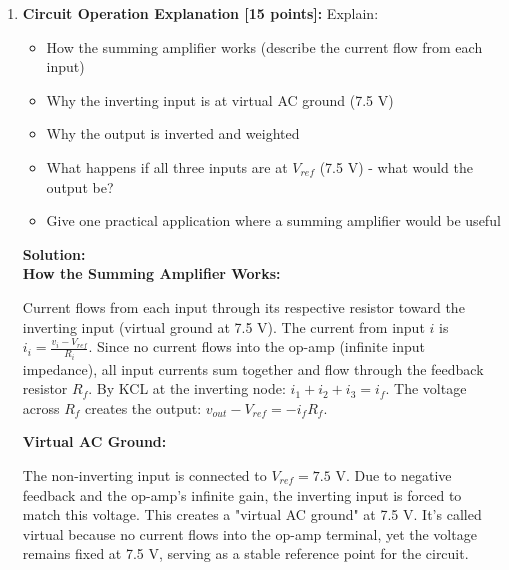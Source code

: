 \documentclass[11pt]{article}
\newenvironment{solution}
    {\color{blue}\textbf{Solution:}\\}
    {}
\begin{document}
\begin{enumerate}[label=\textbf{3.\arabic*}]
\begin{solution}
The absolute output voltage (referenced to GND):
\begin{align*}
v_{out} &= V_{ref} + v_{out,ac} = 7.5 + (-0.5) = 7.0\text{ V}
\end{align*}

\textbf{Verification using absolute voltages:}
\begin{align*}
v_{out} &= V_{ref} - \left(\frac{R_f}{R_1}(v_1 - V_{ref}) + \frac{R_f}{R_2}(v_2 - V_{ref}) + \frac{R_f}{R_3}(v_3 - V_{ref})\right)\\
&= 7.5 - \left(2.0(1.0) + 1.0(0.5) + 4.0(-0.5)\right)\\
&= 7.5 - 0.5 = 7.0\text{ V} \quad \checkmark
\end{align*}
\end{solution}

\vspace{1cm}
    
    \item \textbf{Circuit Operation Explanation [15 points]:} Explain:
    \begin{itemize}
        \item How the summing amplifier works (describe the current flow from each input)
        \item Why the inverting input is at virtual AC ground (7.5 V)
        \item Why the output is inverted and weighted
        \item What happens if all three inputs are at $V_{ref}$ (7.5 V) - what would the output be?
        \item Give one practical application where a summing amplifier would be useful
    \end{itemize}
    
\begin{solution}
\textbf{How the Summing Amplifier Works:}

Current flows from each input through its respective resistor toward the inverting input (virtual ground at 7.5 V). The current from input $i$ is $i_i = \frac{v_i - V_{ref}}{R_i}$. Since no current flows into the op-amp (infinite input impedance), all input currents sum together and flow through the feedback resistor $R_f$. By KCL at the inverting node: $i_1 + i_2 + i_3 = i_f$. The voltage across $R_f$ creates the output: $v_{out} - V_{ref} = -i_f R_f$.

\textbf{Virtual AC Ground:}

The non-inverting input is connected to $V_{ref} = 7.5$ V. Due to negative feedback and the op-amp's infinite gain, the inverting input is forced to match this voltage. This creates a "virtual AC ground" at 7.5 V. It's called virtual because no current flows into the op-amp terminal, yet the voltage remains fixed at 7.5 V, serving as a stable reference point for the circuit.


\end{solution}
\end{enumerate}
\end{document}
